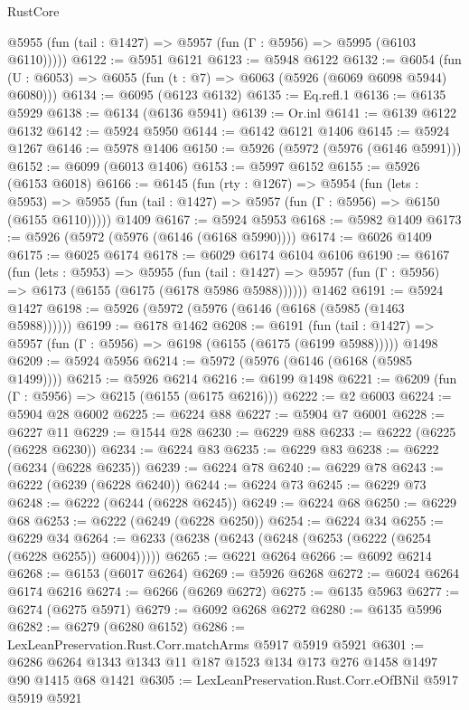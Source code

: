 \begin{lexlean}{RustCore}
\begin{coremodule}
      @5955 (fun (tail : @1427) => @5957 (fun (Γ : @5956) => @5995 (@6103 @6110)))))
@6122 := @5951 @6121
@6123 := @5948 @6122
@6132 := @6054 (fun (U : @6053) => @6055 (fun (t : @7) => @6063 (@5926 (@6069 @6098 @5944) @6080)))
@6134 := @6095 (@6123 @6132)
@6135 := Eq.refl.{1}
@6136 := @6135 @5929
@6138 := @6134 (@6136 @5941)
@6139 := Or.inl
@6141 := @6139 @6122 @6132
@6142 := @5924 @5950
@6144 := @6142 @6121 @1406
@6145 := @5924 @1267
@6146 := @5978 @1406
@6150 := @5926 (@5972 (@5976 (@6146 @5991)))
@6152 := @6099 (@6013 @1406)
@6153 := @5997 @6152
@6155 := @5926 (@6153 @6018)
@6166 := @6145
    (fun (rty : @1267) =>
    @5954
      (fun (lets : @5953) =>
      @5955 (fun (tail : @1427) => @5957 (fun (Γ : @5956) => @6150 (@6155 @6110)))))
    @1409
@6167 := @5924 @5953
@6168 := @5982 @1409
@6173 := @5926 (@5972 (@5976 (@6146 (@6168 @5990))))
@6174 := @6026 @1409
@6175 := @6025 @6174
@6178 := @6029 @6174 @6104 @6106
@6190 := @6167
    (fun (lets : @5953) =>
    @5955
      (fun (tail : @1427) => @5957 (fun (Γ : @5956) => @6173 (@6155 (@6175 (@6178 @5986 @5988))))))
    @1462
@6191 := @5924 @1427
@6198 := @5926 (@5972 (@5976 (@6146 (@6168 (@5985 (@1463 @5988))))))
@6199 := @6178 @1462
@6208 := @6191
    (fun (tail : @1427) => @5957 (fun (Γ : @5956) => @6198 (@6155 (@6175 (@6199 @5988)))))
    @1498
@6209 := @5924 @5956
@6214 := @5972 (@5976 (@6146 (@6168 (@5985 @1499))))
@6215 := @5926 @6214
@6216 := @6199 @1498
@6221 := @6209 (fun (Γ : @5956) => @6215 (@6155 (@6175 @6216)))
@6222 := @2 @6003
@6224 := @5904 @28 @6002
@6225 := @6224 @88
@6227 := @5904 @7 @6001
@6228 := @6227 @11
@6229 := @1544 @28
@6230 := @6229 @88
@6233 := @6222 (@6225 (@6228 @6230))
@6234 := @6224 @83
@6235 := @6229 @83
@6238 := @6222 (@6234 (@6228 @6235))
@6239 := @6224 @78
@6240 := @6229 @78
@6243 := @6222 (@6239 (@6228 @6240))
@6244 := @6224 @73
@6245 := @6229 @73
@6248 := @6222 (@6244 (@6228 @6245))
@6249 := @6224 @68
@6250 := @6229 @68
@6253 := @6222 (@6249 (@6228 @6250))
@6254 := @6224 @34
@6255 := @6229 @34
@6264 := @6233 (@6238 (@6243 (@6248 (@6253 (@6222 (@6254 (@6228 @6255)) @6004)))))
@6265 := @6221 @6264
@6266 := @6092 @6214
@6268 := @6153 (@6017 @6264)
@6269 := @5926 @6268
@6272 := @6024 @6264 @6174 @6216
@6274 := @6266 (@6269 @6272)
@6275 := @6135 @5963
@6277 := @6274 (@6275 @5971)
@6279 := @6092 @6268 @6272
@6280 := @6135 @5996
@6282 := @6279 (@6280 @6152)
@6286 := LexLeanPreservation.Rust.Corr.matchArms @5917 @5919 @5921
@6301 := @6286 @6264 @1343 @1343 @11 @187 @1523 @134 @173 @276 @1458 @1497 @90 @1415 @68 @1421
@6305 := LexLeanPreservation.Rust.Corr.eOfBNil @5917 @5919 @5921

\end{coremodule}
\end{lexlean}
